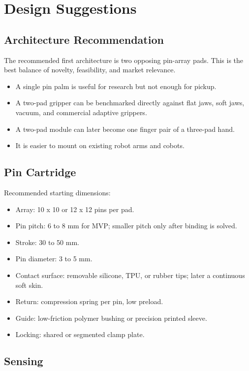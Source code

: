 \documentclass[11pt]{article}
\begin{document}
\section{Design Suggestions}

\subsection{Architecture Recommendation}

The recommended first architecture is two opposing pin-array pads. This is the best balance of novelty, feasibility, and market relevance.

\begin{itemize}[leftmargin=*]
  \item A single pin palm is useful for research but not enough for pickup.
  \item A two-pad gripper can be benchmarked directly against flat jaws, soft jaws, vacuum, and commercial adaptive grippers.
  \item A two-pad module can later become one finger pair of a three-pad hand.
  \item It is easier to mount on existing robot arms and cobots.
\end{itemize}

\subsection{Pin Cartridge}

Recommended starting dimensions:

\begin{itemize}[leftmargin=*]
  \item Array: 10 x 10 or 12 x 12 pins per pad.
  \item Pin pitch: 6 to 8 mm for MVP; smaller pitch only after binding is solved.
  \item Stroke: 30 to 50 mm.
  \item Pin diameter: 3 to 5 mm.
  \item Contact surface: removable silicone, TPU, or rubber tips; later a continuous soft skin.
  \item Return: compression spring per pin, low preload.
  \item Guide: low-friction polymer bushing or precision printed sleeve.
  \item Locking: shared or segmented clamp plate.
\end{itemize}

\subsection{Sensing}
\end{document}
